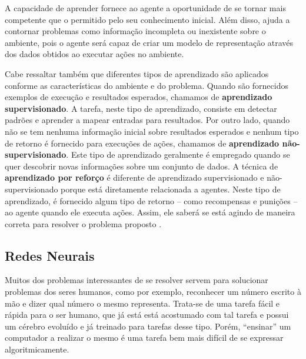 A capacidade de aprender fornece ao agente a oportunidade de se tornar mais
competente que o permitido pelo seu conhecimento inicial.  Além disso, ajuda a
contornar problemas como informação incompleta ou inexistente sobre o ambiente,
pois o agente será capaz de criar um modelo de representação através dos dados
obtidos ao executar ações no ambiente. 

Cabe ressaltar também que diferentes tipos de aprendizado são aplicados
conforme as características do ambiente e do problema. Quando são fornecidos
exemplos de execução e resultados esperados, chamamos de \textbf{aprendizado
supervisionado}. A tarefa, neste tipo de aprendizado, consiste em detectar
padrões e aprender a mapear entradas para resultados. Por outro lado, quando
não se tem nenhuma informação inicial sobre resultados esperados e nenhum tipo
de retorno é fornecido para execuções de ações, chamamos de \textbf{aprendizado
não-supervisionado}. Este tipo de aprendizado geralmente é empregado quando se
quer descobrir novas informações sobre um conjunto de dados. A técnica de
\textbf{aprendizado por reforço} é diferente de aprendizado supervisionado e
não-supervisionado porque está diretamente relacionada a agentes. Neste tipo de
aprendizado, é fornecido algum tipo de retorno -- como recompensas e punições
-- ao agente quando ele executa ações.  Assim, ele saberá se está agindo de
maneira correta para resolver o problema proposto
\cite{Russell:1995:AIM:193191}.

\subsection{Redes Neurais}

Muitos dos problemas interessantes de se resolver servem para solucionar
problemas dos seres humanos, como por exemplo, reconhecer um número escrito à
mão e dizer qual número o mesmo representa. Trata-se de uma tarefa fácil e
rápida para o ser humano, que já está está acostumado com tal tarefa e possui
um cérebro evoluído e já treinado para tarefas desse tipo. Porém, ``ensinar'' um
computador a realizar o mesmo é uma tarefa bem mais difícil de se expressar
algoritmicamente.


